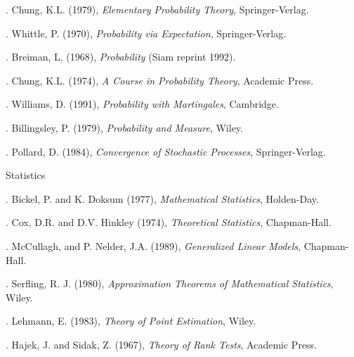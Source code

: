 \vspace{3mm}
.   Chung, K.L. (1979), {\it Elementary Probability Theory}, Springer-Verlag.

.   Whittle, P. (1970), {\it Probability via Expectation}, Springer-Verlag.

.   Breiman, L. (1968), {\it Probability} (Siam reprint 1992).

.   Chung, K.L. (1974), {\it A Course in Probability Theory}, Academic Press.

.   Williams, D. (1991), {\it Probability with Martingales}, Cambridge.

.   Billingsley, P. (1979), {\it Probability and Measure}, Wiley.

.   Pollard, D. (1984), {\it Convergence of Stochastic Processes}, Springer-Verlag.

\vspace{3mm}
\noindent
Statistics

\vspace{3mm}
.  Bickel, P. and K. Doksum (1977), {\it Mathematical Statistics}, Holden-Day.

.   Cox, D.R. and D.V. Hinkley (1974), {\it Theoretical Statistics}, Chapman-Hall.

.   McCullagh,  and P. Nelder, J.A. (1989), {\it Generalized Linear Models}, Chapman-Hall.

.   Serfling, R. J. (1980), {\it Approximation Theorems of Mathematical 
Statistics}, Wiley.

.   Lehmann, E. (1983), {\it Theory of Point Estimation}, Wiley.

.   Hajek, J. and Sidak, Z. (1967), {\it Theory of Rank Tests}, Academic Press.


